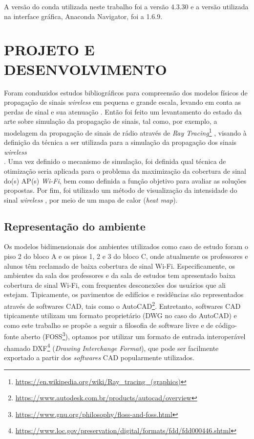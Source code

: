 \documentclass[
	12pt,				%
	twoside,			%
	a4paper,			%
	english,			%
	french,				%
	spanish,			%
	brazil				%
	]{abntex2}
\begin{document}
A versão do conda utilizada neste trabalho foi a versão 4.3.30 e a
versão utilizada na interface gráfica, Anaconda Navigator, foi a 1.6.9.

\chapter{PROJETO E DESENVOLVIMENTO}\label{projeto-e-desenvolvimento}

Foram conduzidos estudos bibliográficos para compreensão dos modelos
físicos de propagação de sinais \emph{wireless} em pequena e grande
escala, levando em conta as perdas de sinal e sua atenuação
\cite{ALMERS}. Então foi feito um levantamento do estado da arte sobre
simulação da propagação de sinais, tal como, por exemplo, a modelagem da
propagação de sinais de rádio através de \emph{Ray Tracing}\footnote{\url{https://en.wikipedia.org/wiki/Ray_tracing_(graphics)}}
\cite{YUN}, visando à definição da técnica a ser utilizada para a
simulação da propagação dos sinais \emph{wireless}\\
\cite{LENTZ, NAJNUDEL, SANDEEP}. Uma vez definido o mecanismo de
simulação, foi definida qual técnica de otimização seria aplicada para o
problema da maximização da cobertura de sinal do(s) AP(s) \emph{Wi-Fi},
bem como definida a função objetivo para avaliar as soluções propostas.
Por fim, foi utilizado um método de visualização da intensidade do sinal
\emph{wireless} \cite{RENSBURG,SULAIMAN} , por meio de um mapa de calor
(\emph{heat map}).

\section{Representação do
ambiente}\label{representauxe7uxe3o-do-ambiente}

Os modelos bidimensionais dos ambientes utilizados como caso de estudo
foram o piso 2 do bloco A e os pisos 1, 2 e 3 do bloco C, onde
atualmente os professores e alunos têm reclamado de baixa cobertura de
sinal Wi-Fi. Especificamente, os ambientes da sala dos professores e da
sala de estudos tem apresentado baixa cobertura de sinal Wi-Fi, com
frequentes desconexões dos usuários que ali estejam. Tipicamente, os
pavimentos de edifícios e residências são representados através de
softwares CAD, tais como o AutoCAD\footnote{\url{https://www.autodesk.com.br/products/autocad/overview}}.
Entretanto, softwares CAD tipicamente utilizam um formato proprietário
(DWG no caso do AutoCAD) e como este trabalho se propõe a seguir a
filosofia de software livre e de código-fonte aberto (FOSS\footnote{\url{https://www.gnu.org/philosophy/floss-and-foss.html}}),
optamos por utilizar um formato de entrada interoperável chamado
DXF\footnote{\url{https://www.loc.gov/preservation/digital/formats/fdd/fdd000446.shtml}}
(\emph{Drawing Interchange Format}), que pode ser facilmente exportado a
partir dos \emph{softwares} CAD popularmente utilizados.
\end{document}
